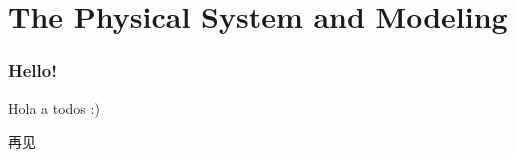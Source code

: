 
\section{The Physical System and Modeling}

\begin{frame}
  \frametitle{Hello!}
  Hola a todos :)

  再见
\end{frame}

